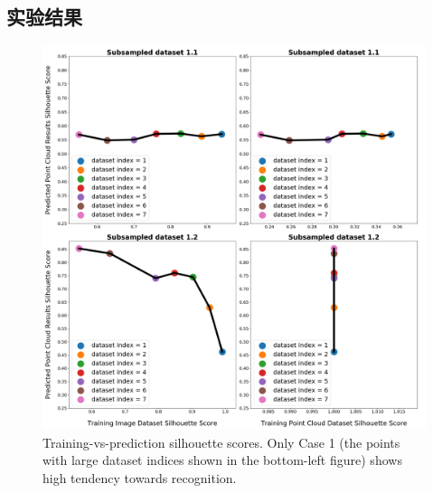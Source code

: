 \documentclass[bachelor, nocolorlinks, printoneside]{seuthesis} %
\begin{document}
\begin{Main}
\section{实验结果}
\begin{figure}[h!]
    \centering
    \includegraphics[width=.95\textwidth]{figs/silhouette-dataset-1.png}
    \caption{\small Training-vs-prediction silhouette scores. Only Case 1 (the points with large dataset indices shown in the bottom-left figure) shows high tendency towards recognition.}
    \label{fig:silhouette-dataset-1.png}
\end{figure}


\end{Main}
\end{document}

